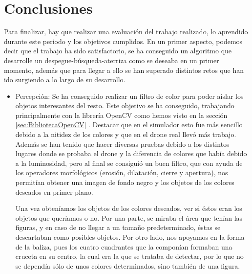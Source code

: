 \chapter{Conclusiones}\label{cap.conclusiones}

\hspace{1cm} Para finalizar, hay que realizar una evaluaci\'on del trabajo realizado, lo aprendido durante este periodo y los objetivos cumplidos. En un primer aspecto, podemos decir que el trabajo ha sido satisfactorio, se ha conseguido un algoritmo que desarrolle un despegue-b\'usqueda-aterriza como se deseaba en un primer momento, adem\'as que para llegar a ello se han superado distintos retos que han ido surgiendo a lo largo de su desarrollo.

\begin{itemize}
\item{Percepci\'on:} Se ha conseguido realizar un filtro de color para poder aislar los objetos interesantes del resto. Este objetivo se ha conseguido, trabajando principalmente con la librer\'ia OpenCV como hemos visto en la secci\'on \ref{sec:BibliotecaOpenCV} . Destacar que en el simulador esto fue m\'as sencillo debido a la nitidez de los colores y que en el drone real llev\'o m\'as trabajo. Adem\'as se han tenido que hacer diversas pruebas debido a los distintos lugares donde se probaba el drone y la diferencia de colores que hab\'ia debido a la luminosidad, pero al final se consigui\'o un buen filtro, que con ayuda de los operadores morfol\'ogicos (erosi\'on, dilataci\'on, cierre y apertura), nos permit\'ian obtener una imagen de fondo negro y los objetos de los colores deseados en primer plano. %

\hspace{1cm} Una vez obten\'iamos los objetos de los colores deseados, ver si \'estos eran los objetos que quer\'iamos o no. Por una parte, se miraba el \'area que ten\'ian las figuras, y en caso de no llegar a un tamaño predeterminado, \'estas se descartaban como posibles objetos. Por otro lado, nos apoyamos en la forma de la baliza, pues los cuatro cuadrantes que la compon\'ian formaban una cruceta en su centro, la cual era la que se trataba de detectar, por lo que no se depend\'ia s\'olo de unos colores determinados, sino tambi\'en de una figura. 



\end{itemize}
